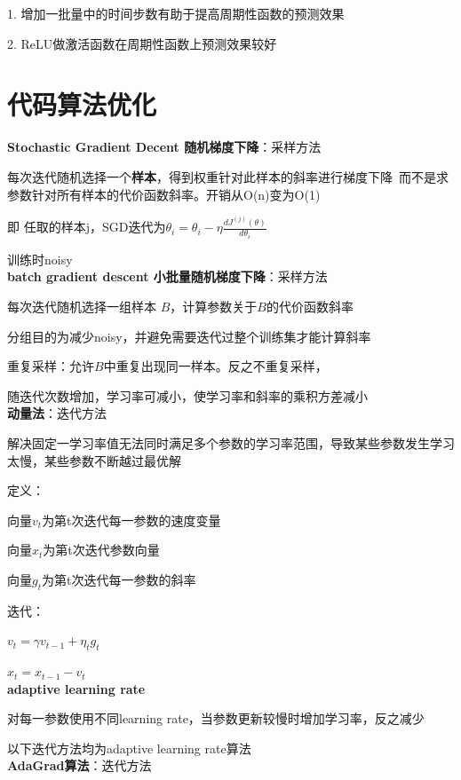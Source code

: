 \documentclass[UTF8]{ctexart}
\begin{document}
  1. 增加一批量中的时间步数有助于提高周期性函数的预测效果

  2. ReLU做激活函数在周期性函数上预测效果较好


\section{代码算法优化}
\noindent \textbf{Stochastic Gradient Decent 随机梯度下降}：采样方法

  每次迭代随机选择一个\textbf{样本}，得到权重针对此样本的斜率进行梯度下降\ 而不是求参数针对所有样本的代价函数斜率。开销从O(n)变为O(1)

  \quad 即 任取的样本j，SGD迭代为$\theta_i = \theta_i - \eta \frac{d J^{(j)}(\theta)}{d \theta_i}$
  
  \quad 训练时noisy\\
\textbf{batch gradient descent 小批量随机梯度下降}：采样方法

  每次迭代随机选择一组样本 $B$，计算参数关于$B$的代价函数斜率

  \quad 分组目的为减少noisy，并避免需要迭代过整个训练集才能计算斜率

  重复采样：允许$B$中重复出现同一样本。反之不重复采样，

  随迭代次数增加，学习率可减小，使学习率和斜率的乘积方差减小\\
\textbf{动量法}：迭代方法

  解决固定一学习率值无法同时满足多个参数的学习率范围，导致某些参数发生学习太慢，某些参数不断越过最优解

  定义：
  
  \quad 向量$v_t$为第t次迭代每一参数的速度变量

  \quad 向量$x_t$为第t次迭代参数向量

  \quad 向量$g_t$为第t次迭代每一参数的斜率

  迭代：

  \quad $v_t = \gamma v_{t-1} + \eta_t g_t$

  \quad $x_t = x_{t-1} - v_t$\\
\textbf{adaptive learning rate}

  对每一参数使用不同learning rate，当参数更新较慢时增加学习率，反之减少
  
  以下迭代方法均为adaptive learning rate算法\\
\textbf{AdaGrad算法}：迭代方法
\end{document}
